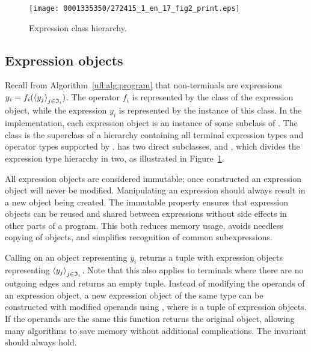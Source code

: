 \begin{figure}[!b]
\vspace*{-4pt}
\texttt{[image: 0001335350/272415\_1\_en\_17\_fig2\_print.eps]}
\caption{Expression class hierarchy.}
\label{ufl:fig:expr}\vspace*{-16pt}
\end{figure}

\vspace*{-1pt}
\subsection{Expression objects}

Recall from Algorithm~\ref{ufl:alg:program} that non-terminals are
expressions $y_i = f_i(\left<y_j\right>_{j\in\mathfrak{I}_i})$.  The operator
$f_i$ is represented by the class of the expression object, while
the expression $y_i$ is represented by the instance of this class.
In the \ufl{} implementation, each expression object is an instance of
some subclass of . The class  is the superclass of
a hierarchy containing all terminal expression types and operator types
supported by \ufl{}.  has two direct subclasses, 
and , which divides the expression type hierarchy in two,
as illustrated in Figure~\ref{ufl:fig:expr}.

All expression objects are considered immutable; once constructed an
expression object will never be modified.  Manipulating an expression
should always result in a new object being created.  The immutable
property ensures that expression objects can be reused and shared
between expressions without side effects in other parts of a program.
This both reduces memory usage, avoids needless copying of objects,
and simplifies recognition of common subexpressions.

Calling  on an  object  representing
$y_i$ returns a tuple with expression objects representing
$\left<y_j\right>_{j\in\mathfrak{I}_i}$.  Note that this also applies to
terminals where there are no outgoing edges and 
returns an empty tuple.  Instead of modifying the operands of an
expression object, a new expression object of the same type can be
constructed with modified operands using ,
where  is a tuple of expression objects. If the operands
are the same this function returns the original object, allowing many
algorithms to save memory without additional complications. The invariant
 should always hold.

